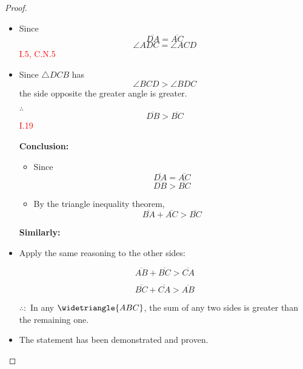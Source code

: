 \begin{proof}

\begin{itemize}

\item Since 
\[\overline{DA} = \overline{AC}\]
\[\angle{ADC} = \angle{ACD}\] \hfill\textcolor{red}{I.5, C.N.5}

\item Since $\triangle{DCB}$ has 
\[\angle{BCD} > \angle{BDC}\] 
the side opposite the greater angle is greater. 

\item[$\therefore$]
 \[\overline{DB} > \overline{BC}\] \hfill\textcolor{red}{I.19}

\textbf{Conclusion:}
\begin{itemize}
  \item Since 
\[\overline{DA} = \overline{AC}\] 
\[\overline{DB} > \overline{BC}\]
 
  \item By the triangle inequality theorem, 
  \[\overline{BA} + \overline{AC} > \overline{BC}\]
\end{itemize}

\textbf{Similarly:}

  \item Apply the same reasoning to the other sides:
   
      \[  \overline{AB} + \overline{BC} > \overline{CA}\]
      
      \[ \overline{BC} + \overline{CA} > \overline{AB}\]
   
\item[$\therefore:$] In any $\widetriangle{ABC}$, the sum of any two sides is greater than the remaining one.

  \item The statement has been demonstrated and proven.

\end{itemize}

\end{proof}
